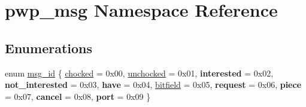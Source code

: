 \hypertarget{namespacepwp__msg}{}\section{pwp\+\_\+msg Namespace Reference}
\label{namespacepwp__msg}
\subsection*{Enumerations}
\begin{DoxyCompactItemize}
\item 
enum \hyperlink{namespacepwp__msg_a0b9a29508f00a30e5138d2b78f4b1daf}{msg\+\_\+id} \{ \newline
\hyperlink{namespacepwp__msg_a0b9a29508f00a30e5138d2b78f4b1dafae1d8b3754d66ec7fcad827fb54eaeea2}{chocked} = 0x00, 
\hyperlink{namespacepwp__msg_a0b9a29508f00a30e5138d2b78f4b1dafa55689e288bf71e7737faaf385b1c528b}{unchocked} = 0x01, 
{\bfseries interested} = 0x02, 
{\bfseries not\+\_\+interested} = 0x03, 
\newline
{\bfseries have} = 0x04, 
\hyperlink{namespacepwp__msg_a0b9a29508f00a30e5138d2b78f4b1dafac3a2343a7b67a371e241ae2184bfe9cd}{bitfield} = 0x05, 
{\bfseries request} = 0x06, 
{\bfseries piece} = 0x07, 
\newline
{\bfseries cancel} = 0x08, 
{\bfseries port} = 0x09
 \}
\end{DoxyCompactItemize}
